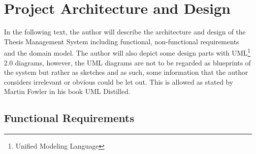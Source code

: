 \chapter{Project Architecture and Design}

In the following text, the author will describe the architecture and design of the Thesis Management System including functional, non-functional requirements and the domain model. The author will also depict some design parts with UML\footnote{Unified Modeling Language} 2.0 diagrams, however, the UML diagrams are not to be regarded as blueprints of the system but rather as sketches and as such, some information that the author considers irrelevant or obvious could be let out. This is allowed as stated by Martin Fowler in his book UML Distilled\cite{fowler-uml}.

\section{Functional Requirements}

